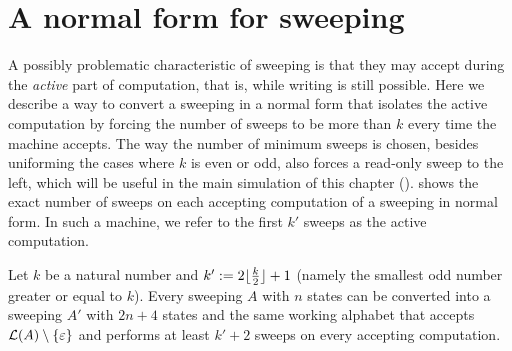 \section{A normal form for sweeping \texorpdfstring{\kDLAs}{k-DLAs}}\label{sec:equiv-swep-dla}
A possibly problematic characteristic of sweeping \kDLAs is that they may accept during the \emph{active} part of computation, that is, while writing is still possible.
Here we describe a way to convert a sweeping \kDLA in a normal form that isolates the active computation by forcing the number of sweeps to be more than $k$ every time the machine accepts.
The way the number of minimum sweeps is chosen, besides uniforming the cases where $k$ is even or odd, also forces a read-only sweep to the left, which will be useful in the main simulation of this chapter ().
 shows the exact number of sweeps on each accepting computation of a sweeping \kDLA in normal form.
In such a machine, we refer to the first $k'$ sweeps as the active computation.
\begin{thrm}\label{thm:equiv-swep-dla}
	Let $k$ be a natural number and $k':=2\lfloor \frac{k}{2} \rfloor+1$ (namely the smallest odd number greater or equal to $k$).
	Every sweeping \kDLA $A$ with $n$ states can be converted into a sweeping \kDLA $A'$ with $2n+4$ states and the same working alphabet that accepts $\mathcal L(A)\setminus\{\varepsilon\}$ and performs at least $k'+2$ sweeps on every accepting computation.
\end{thrm}
